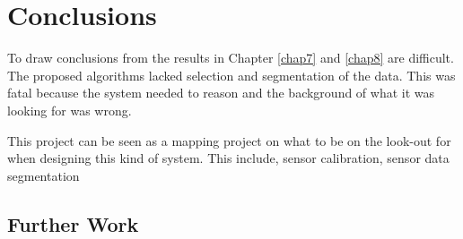 
\chapter{Conclusions}
\label{chap9}
To draw conclusions from the results in Chapter \ref{chap7} and \ref{chap8} are difficult.
The proposed algorithms lacked selection and segmentation of the data. This was fatal
because the system needed to reason and the background of what it was looking for was
wrong. 


This project can be seen as a mapping project on what to be on the look-out for when
designing this kind of system. This include, sensor calibration, sensor data
segmentation


\section{Further Work}


